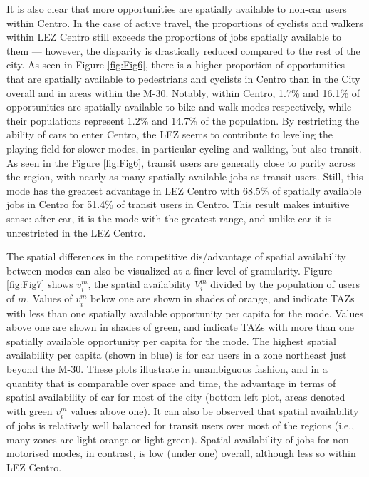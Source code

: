 \documentclass[10pt,letterpaper]{article}
\begin{document}
It is also clear that more opportunities are spatially available to
non-car users within Centro. In the case of active travel, the
proportions of cyclists and walkers within LEZ Centro still exceeds the
proportions of jobs spatially available to them --- however, the
disparity is drastically reduced compared to the rest of the city. As
seen in Figure \ref{fig:Fig6}, there is a higher proportion of
opportunities that are spatially available to pedestrians and cyclists
in Centro than in the City overall and in areas within the M-30.
Notably, within Centro, 1.7\% and 16.1\% of opportunities are spatially
available to bike and walk modes respectively, while their populations
represent 1.2\% and 14.7\% of the population. By restricting the ability
of cars to enter Centro, the LEZ seems to contribute to leveling the
playing field for slower modes, in particular cycling and walking, but
also transit. As seen in the Figure \ref{fig:Fig6}, transit users are
generally close to parity across the region, with nearly as many
spatially available jobs as transit users. Still, this mode has the
greatest advantage in LEZ Centro with 68.5\% of spatially available jobs
in Centro for 51.4\% of transit users in Centro. This result makes
intuitive sense: after car, it is the mode with the greatest range, and
unlike car it is unrestricted in the LEZ Centro.

The spatial differences in the competitive dis/advantage of spatial
availability between modes can also be visualized at a finer level of
granularity. Figure \ref{fig:Fig7} shows \(v_i^m\), the spatial
availability \(V_i^m\) divided by the population of users of \(m\).
Values of \(v_i^m\) below one are shown in shades of orange, and
indicate TAZs with less than one spatially available opportunity per
capita for the mode. Values above one are shown in shades of green, and
indicate TAZs with more than one spatially available opportunity per
capita for the mode. The highest spatial availability per capita (shown
in blue) is for car users in a zone northeast just beyond the M-30.
These plots illustrate in unambiguous fashion, and in a quantity that is
comparable over space and time, the advantage in terms of spatial
availability of car for most of the city (bottom left plot, areas
denoted with green \(v_i^m\) values above one). It can also be observed
that spatial availability of jobs is relatively well balanced for
transit users over most of the regions (i.e., many zones are light
orange or light green). Spatial availability of jobs for non-motorised
modes, in contrast, is low (under one) overall, although less so within
LEZ Centro.
\end{document}
